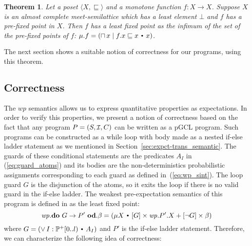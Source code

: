 \documentclass{eptcs}
\theoremstyle{plain}
\newtheorem{theorem}{Theorem}[section]
\theoremstyle{definition}
\newcommand{\lit}[1]{\ensuremath{\mathit{#1}}}
\newcommand{\Init}{\mbox{\small\ensuremath{\mathcal{I}}}}
\newcommand{\totype}{\ensuremath{\ra}}
\newcommand{\ra}{\ensuremath{\rightarrow}}
\newcommand{\dotsep}{\mbox{\raisebox{0.4ex}{\tiny\ensuremath{\:\;\bullet\;\:}}}}
\newcommand{\Not}{\ensuremath{\neg}}
\newcommand{\Wp}{\lit{wp}}
\newcommand{\DO}[0]{\textbf{do}}
\newcommand{\OD}[0]{\textbf{od}}
\newcommand{\slq}{\ensuremath{\sqsubseteq}}
\newcommand{\noi}[0]{\noindent}
\begin{document}
\begin{theorem} \label{th:fixpoint}
  Let a poset $\langle X, \slq \rangle$ and a monotone function $f : X \totype
  X$. Suppose $X$ is an almost complete meet-semilattice which has a least
  element $\bot$ and $f$ has a \mbox{pre-fixed} point in $X$. Then $f$ has a
  least fixed point as the infimum of the set of the pre-fixed points of $f$:
  $\mu.f = (\sqcap \, x \;|\; f.x \slq x \dotsep x)$\enspace.








\end{theorem}











\noi The next section shows a suitable notion of correctness for our programs,
using this theorem.





\subsection{Correctness} \label{sec:correctness}

The $\Wp$ semantics allows us to express quantitative properties as
expectations. In order to verify this properties, we present a notion of
correctness based on the fact that any program $P = (S,\Init,C)$ can be written
as a pGCL program. Such programs can be constructed as a while loop with
body made as a nested \mbox{if-else} ladder statement as we mentioned in
Section~\ref{sec:expct-trans_semantic}.  The guards of these conditional
statements are the predicates $A_I$ in (\ref{eq:guard_atoms}) and its bodies are
the non-deterministics probabilistic assignments corresponding to each guard as
defined in~(\ref{eq:wp_sint}).
The loop guard $G$ is the disjunction of the atoms, so it exits the loop if there is no valid guard in the if-else ladder.
The weakest pre-expectation semantics of this
program is defined in \cite{morgan04arp} as the least fixed point:
\[
  \Wp.\DO\ G \ra P'\ \OD.\beta 
  = (\mu X \dotsep [G] \times \Wp.P'.X + [\Not G] \times \beta)
\]
where $G = (\vee \, I:\PowerNonEmpty[0..l) \dotsep A_I)$ and $P'$ is the
\mbox{if-else} ladder statement. Therefore, we can characterize the following
idea of correctness:
\end{document}
